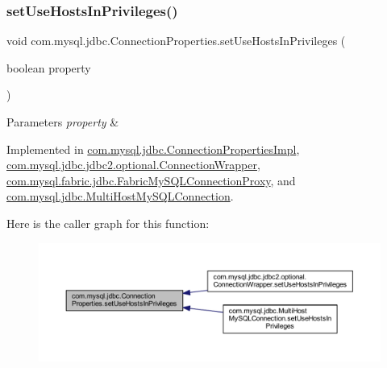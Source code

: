 \subsubsection{\texorpdfstring{set\+Use\+Hosts\+In\+Privileges()}{setUseHostsInPrivileges()}}
{\footnotesize\ttfamily void com.\+mysql.\+jdbc.\+Connection\+Properties.\+set\+Use\+Hosts\+In\+Privileges (\begin{DoxyParamCaption}\item[{boolean}]{property }\end{DoxyParamCaption})}


\begin{DoxyParams}{Parameters}
{\em property} & \\
\hline
\end{DoxyParams}


Implemented in \mbox{\hyperlink{classcom_1_1mysql_1_1jdbc_1_1_connection_properties_impl_aabcdc99cc369972b7970a0f17f88367e}{com.\+mysql.\+jdbc.\+Connection\+Properties\+Impl}}, \mbox{\hyperlink{classcom_1_1mysql_1_1jdbc_1_1jdbc2_1_1optional_1_1_connection_wrapper_a5d5646bf3f93b51fcf264bec6c2aacf1}{com.\+mysql.\+jdbc.\+jdbc2.\+optional.\+Connection\+Wrapper}}, \mbox{\hyperlink{classcom_1_1mysql_1_1fabric_1_1jdbc_1_1_fabric_my_s_q_l_connection_proxy_a59a8fdb0083f5520045786368f44e2dd}{com.\+mysql.\+fabric.\+jdbc.\+Fabric\+My\+S\+Q\+L\+Connection\+Proxy}}, and \mbox{\hyperlink{classcom_1_1mysql_1_1jdbc_1_1_multi_host_my_s_q_l_connection_a4e5dd7ecb303ca181e108a90b5917445}{com.\+mysql.\+jdbc.\+Multi\+Host\+My\+S\+Q\+L\+Connection}}.

Here is the caller graph for this function\+:\nopagebreak
\begin{figure}[H]
\begin{center}
\leavevmode
\includegraphics[width=350pt]{interfacecom_1_1mysql_1_1jdbc_1_1_connection_properties_aefb08a45df4754d8d6c96b06d36991b5_icgraph}
\end{center}
\end{figure}
\mbox{\label{interfacecom_1_1mysql_1_1jdbc_1_1_connection_properties_a27a764e918cf2d90a6bbedec87ce6820}} 
